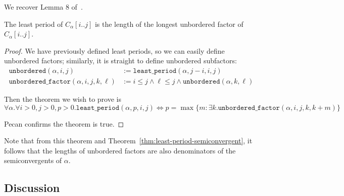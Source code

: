 We recover Lemma 8 of~\cite{Currie2009LeastPO}.
\begin{theorem}
    The least period of $C_{\alpha}[i..j]$ is the length of the longest unbordered factor of $C_{\alpha}[i..j]$.
\end{theorem}
\begin{proof}
We have previously defined least periods, so we can easily define unbordered factors; similarly, it is straight to define unbordered subfactors:
\begin{align*}
    \texttt{unbordered}(\alpha,i,j) &:= \texttt{least\_period}(\alpha,j - i, i, j) \\
    \texttt{unbordered\_factor}(\alpha,i,j,k,\ell) &:= i \leq j \land \ell \leq j \land \texttt{unbordered}(\alpha,k,\ell) 
\end{align*}

Then the theorem we wish to prove is
\[
    \forall \alpha. \forall i > 0, j > 0, p > 0.
        \texttt{least\_period}(\alpha,p,i,j) \iff p = \max \{ m : \exists k. \texttt{unbordered\_factor}(\alpha,i,j,k,k+m)\}
\]

Pecan confirms the theorem is true.
\end{proof}

Note that from this theorem and Theorem~\ref{thm:least-period-semiconvergent}, it follows that the lengths of unbordered factors are also denominators of the semiconvergents of $\alpha$.


\subsection{Discussion}

